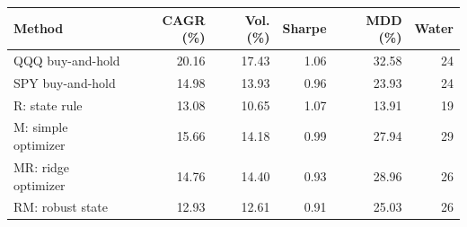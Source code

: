 \begin{tabular}{@{}lrrrrr@{}}\toprule
Method & CAGR (\%) & Vol. (\%) & Sharpe & MDD (\%) & Water\\\midrule
QQQ buy-and-hold & 20.16 & 17.43 & 1.06 & 32.58 & 24\\
SPY buy-and-hold & 14.98 & 13.93 & 0.96 & 23.93 & 24\\
R: state rule & 13.08 & 10.65 & 1.07 & 13.91 & 19\\
M: simple optimizer & 15.66 & 14.18 & 0.99 & 27.94 & 29\\
MR: ridge optimizer & 14.76 & 14.40 & 0.93 & 28.96 & 26\\
RM: robust state & 12.93 & 12.61 & 0.91 & 25.03 & 26\\
\bottomrule
\end{tabular}
